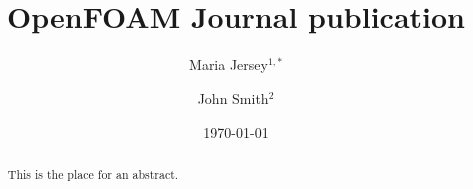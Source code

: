 \documentclass[e-only,10pt,reqno]{ofj}
\newcommand{\OF}[0]{OpenFOAM\textsuperscript{\textregistered} }
\begin{document}


\title[\OF Journal publication]{\OF Journal publication}





\author{Maria Jersey$^{1,*}$}
\address{$^1$Address1}

\author{John Smith$^2$}
\address{$2$Address2} %




\begin{abstract}
This is the place for an abstract.
\end{abstract}


\date{\today}

\dedicatory{}


\maketitle

\linenumbers

\end{document}
